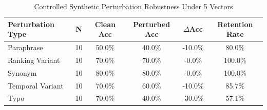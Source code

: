 \begin{table}[t]
\centering
\small
\caption{Controlled Synthetic Perturbation Robustness Under 5 Vectors}
\label{tab:robustness}
\begin{tabular}{lccccc}
\toprule
\textbf{Perturbation Type} & \textbf{N} & \textbf{Clean Acc} & \textbf{Perturbed Acc} & \textbf{$\Delta$Acc} & \textbf{Retention Rate} \\
\midrule
Paraphrase & 10 & 50.0\% & 40.0\% & -10.0\% & 80.0\% \\
Ranking Variant & 10 & 70.0\% & 70.0\% & -0.0\% & 100.0\% \\
Synonym & 10 & 80.0\% & 80.0\% & -0.0\% & 100.0\% \\
Temporal Variant & 10 & 70.0\% & 60.0\% & -10.0\% & 85.7\% \\
Typo & 10 & 70.0\% & 40.0\% & -30.0\% & 57.1\% \\
\bottomrule
\end{tabular}
\end{table}